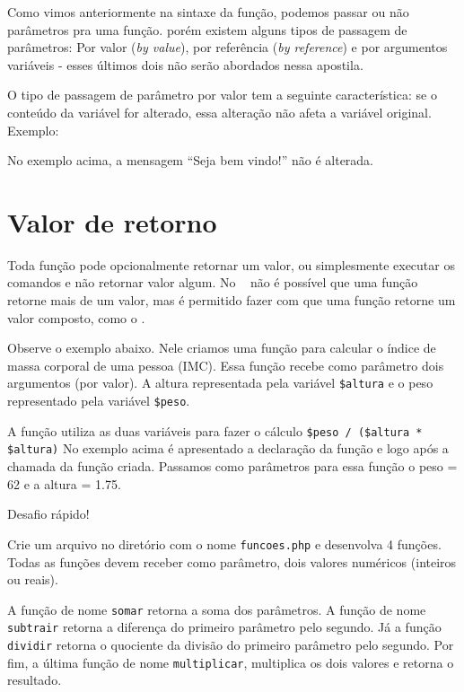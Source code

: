 Como vimos anteriormente na sintaxe da função, podemos passar ou não parâmetros pra uma função. 
porém existem alguns tipos de passagem de parâmetros: Por valor (\textit{by value}), por 
referência (\textit{by reference}) e por argumentos variáveis - esses últimos dois não 
serão abordados nessa apostila.

O tipo de passagem de parâmetro por valor tem a seguinte característica: se o conteúdo da 
variável for alterado, essa alteração não afeta a variável original. Exemplo:



No exemplo acima, a mensagem ``Seja bem vindo!'' não é alterada.

\section{Valor de retorno}
\label{valor-de-retorno}

Toda função pode opcionalmente retornar um valor, ou simplesmente executar os comandos 
e não retornar valor algum. No \php~ não é possível que uma função retorne mais de um valor, 
mas é permitido fazer com que uma função retorne um valor composto, como o \tipoarray. 

Observe o exemplo abaixo. Nele criamos uma função para calcular o índice de massa 
corporal de uma pessoa (IMC). Essa função recebe como parâmetro dois argumentos (por valor). 
A altura representada pela variável \texttt{\$altura} e o peso representado pela 
variável \texttt{\$peso}. 



A função utiliza as duas variáveis para fazer o cálculo \texttt{\$peso / (\$altura * \$altura)}
No exemplo acima é apresentado a declaração da função e logo após a chamada
da função criada. Passamos como parâmetros para essa função o peso = 62 e a 
altura = 1.75. 

\begin{framed}
{\Large Desafio rápido!}

Crie um arquivo no diretório  com o nome \texttt{funcoes.php}
e desenvolva 4 funções. Todas as funções devem receber como parâmetro, dois valores numéricos
(inteiros ou reais). 

A função de nome \texttt{somar} retorna a soma dos parâmetros. A função
de nome \texttt{subtrair} retorna a diferença do primeiro parâmetro pelo segundo.
Já a função \texttt{dividir} retorna o quociente da divisão do primeiro parâmetro pelo segundo.
Por fim, a última função de nome \texttt{multiplicar}, multiplica os dois valores e retorna
o resultado.
\end{framed}


